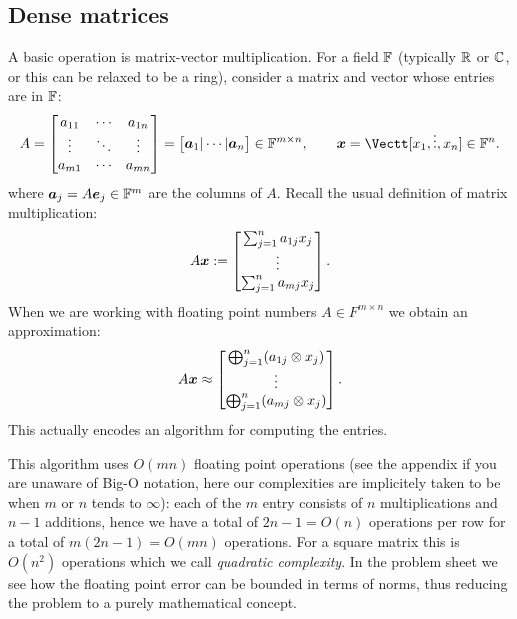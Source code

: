 \subsection{Dense matrices}
A basic operation is matrix-vector multiplication. For a field ${\mathbb F}$ (typically ${\mathbb R}$ or ${\mathbb C}$, or this can be relaxed to be a ring), consider a matrix and vector whose entries are in ${\mathbb F}$:
\[
A = \begin{bmatrix}
a_{11} & \ensuremath{\cdots} & a_{1n} \\
\ensuremath{\vdots} & \ensuremath{\ddots} & \ensuremath{\vdots} \\
a_{m1} & \ensuremath{\cdots} & a_{mn}
\end{bmatrix} = \begin{bmatrix} \ensuremath{\bm{\a}}_1 | \ensuremath{\cdots} | \ensuremath{\bm{\a}}_n \end{bmatrix} \ensuremath{\in} \ensuremath{\bbF}^{m \ensuremath{\times} n}, \qquad
\ensuremath{\bm{\x}} = \Vectt[x_1,\ensuremath{\vdots},x_n] \ensuremath{\in} \ensuremath{\bbF}^n.
\]
where $\bm{{\mbox{\boldmath$a$\unboldmath}}}_j = A \bm{{\mbox{\boldmath$e$\unboldmath}}}_j \in {\mathbb F}^m$ are the columns of $A$. Recall the usual definition of matrix multiplication:
\[
A\bm{{\mbox{\boldmath$x$\unboldmath}}} := \begin{bmatrix} \sum_{j=1}^n a_{1j} x_j \\ \vdots \\ \sum_{j=1}^n a_{mj} x_j \end{bmatrix}.
\]
When we are working with floating point numbers $A \ensuremath{\in} F^{m \ensuremath{\times} n}$ we obtain an approximation:
\[
A\bm{{\mbox{\boldmath$x$\unboldmath}}} \approx \begin{bmatrix} \bigoplus_{j=1}^n (a_{1j}  \otimes x_j) \\ \vdots \\  \bigoplus_{j=1}^n (a_{mj}  \otimes x_j) \end{bmatrix}.
\]
This actually encodes an algorithm for computing the entries.

This algorithm uses $O(m n)$ floating point operations (see the appendix if you are unaware of Big-O notation, here our complexities are implicitely taken to be when $m$ or $n$ tends to $\ensuremath{\infty}$): each of the $m$ entry consists of $n$ multiplications and $n-1$ additions, hence we have a total of $2n-1 = O(n)$ operations per row for a total of $m(2n-1) = O(mn)$ operations. For a square matrix this is $O(n^2)$ operations which we call \emph{quadratic complexity}. In the problem sheet we see how the floating point error can be bounded in terms of norms, thus reducing the problem to a purely mathematical concept.

